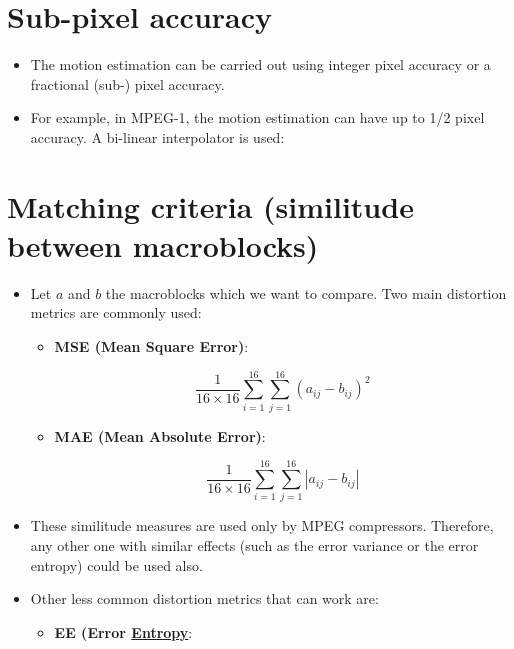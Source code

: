 {

\section{Sub-pixel accuracy}

\begin{itemize}
\tightlist
\item
  The motion estimation can be carried out using integer pixel accuracy
  or a fractional (sub-) pixel accuracy.
\item
  For example, in MPEG-1, the motion estimation can have up to 1/2 pixel
  accuracy. A bi-linear interpolator is used:
\end{itemize}

\section{Matching criteria (similitude between macroblocks)}
\begin{itemize}
\item
  Let $a$ and $b$ the macroblocks which we want to compare. Two main
  distortion metrics are commonly used:

  \begin{itemize}
  \item
    \textbf{MSE (Mean Square Error)}:

    \begin{equation}
      \frac{1}{16\times 16}\sum_{i=1}^{16}\sum_{j=1}^{16}(a_{ij}-b_{ij})^2
    \end{equation}
  \item
    \textbf{MAE (Mean Absolute Error)}:

    \begin{equation}
      \frac{1}{16\times 16}\sum_{i=1}^{16}\sum_{j=1}^{16}|a_{ij}-b_{ij}|
    \end{equation}
  \end{itemize}
\item
  These similitude measures are used only by MPEG compressors.
  Therefore, any other one with similar effects (such as the error
  variance or the error entropy) could be used also.
\item
  Other less common distortion metrics that can work are:

  \begin{itemize}
  \item
    \textbf{EE (Error
    \href{https://en.wikipedia.org/wiki/Entropy_(information_theory)}{Entropy}}:


\end{itemize}
\end{itemize}}
